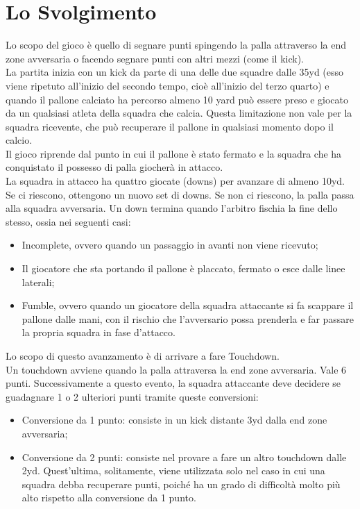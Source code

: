 \documentclass[a4paper, 12pt, oneside]{book}
\begin{document}
	\section{Lo Svolgimento}
	Lo scopo del gioco è quello di segnare punti spingendo la palla attraverso la end zone avversaria o facendo segnare punti con altri mezzi (come il kick).
	\\La partita inizia con un kick da parte di una delle due squadre dalle 35yd (esso viene ripetuto all'inizio del secondo tempo, cioè all'inizio del terzo quarto) e quando il pallone calciato ha percorso almeno 10 yard può essere preso e giocato da un qualsiasi atleta della squadra che calcia. Questa limitazione non vale per la squadra ricevente, che può recuperare il pallone in qualsiasi momento dopo il calcio. 
	\\Il gioco riprende dal punto in cui il pallone è stato fermato e la squadra che ha conquistato il possesso di palla giocherà in attacco.
	\\La squadra in attacco ha quattro giocate (downs) per avanzare di almeno 10yd. Se ci riescono, ottengono un nuovo set di downs. Se non ci riescono, la palla passa alla squadra avversaria. Un down termina quando l'arbitro fischia la fine dello stesso, ossia nei seguenti casi:
	\begin{itemize}
		\item Incomplete, ovvero quando un passaggio in avanti non viene ricevuto;
		\item Il giocatore che sta portando il pallone è placcato, fermato o esce dalle linee laterali;
		\item Fumble, ovvero quando un giocatore della squadra attaccante si fa scappare il pallone dalle mani, con il rischio che l'avversario possa prenderla e far passare la propria squadra in fase d'attacco.
	\end{itemize}
	Lo scopo di questo avanzamento è di arrivare a fare Touchdown.
	\\Un touchdown avviene quando la palla attraversa la end zone avversaria. Vale 6 punti. Successivamente a questo evento, la squadra attaccante deve decidere se guadagnare 1 o 2 ulteriori punti tramite queste conversioni:
	\begin{itemize}
		\item Conversione da 1 punto: consiste in un kick distante 3yd dalla end zone avversaria;
		\item Conversione da 2 punti: consiste nel provare a fare un altro touchdown dalle 2yd. Quest'ultima, solitamente, viene utilizzata solo nel caso in cui una squadra debba recuperare punti, poiché ha un grado di difficoltà molto più alto rispetto alla conversione da 1 punto.
	\end{itemize}
\end{document}
